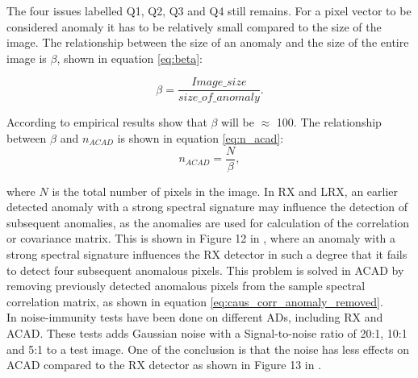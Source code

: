The four issues labelled Q1, Q2, Q3 and Q4 still remains. For a pixel vector to be considered anomaly it has to be relatively small compared to the size of the image. The relationship between the size of an anomaly and the size of the entire image is $\beta$, shown in equation \ref{eq:beta}:

\begin{equation}
    \beta  = \frac{Image\_size}{size\_of\_anomaly}.
    \label{eq:beta}
\end{equation}

According to \cite{chang2006characterization} empirical results show that $\beta$ will be $\approx$ 100.
The relationship between $\beta$ and $n_{ACAD}$ is shown in equation \ref{eq:n_acad}:
\begin{equation}
    n_{ACAD} = \frac{N}{\beta},
    \label{eq:n_acad}
\end{equation}

where $N$ is the total number of pixels in the image. In  RX and LRX, an earlier detected anomaly with a strong spectral signature may influence the detection of subsequent anomalies, as the anomalies are used for calculation of the correlation or covariance matrix. This is shown in Figure 12 in \cite{chang2006characterization}, where an anomaly with a strong spectral signature influences the RX detector in such a degree that it fails to detect four subsequent anomalous pixels. This problem is solved in ACAD by removing previously detected anomalous pixels from the sample spectral correlation matrix, as shown in equation \ref{eq:caus_corr_anomaly_removed}. 
\\


In \cite{chang2006characterization} noise-immunity tests have been done on different ADs, including RX and ACAD. These tests adds Gaussian noise with a Signal-to-noise ratio of 20:1, 10:1 and 5:1 to a test image. One of the conclusion is that the noise has less effects on ACAD compared to the RX detector as shown in Figure 13 in \cite{chang2006characterization}.
\\


